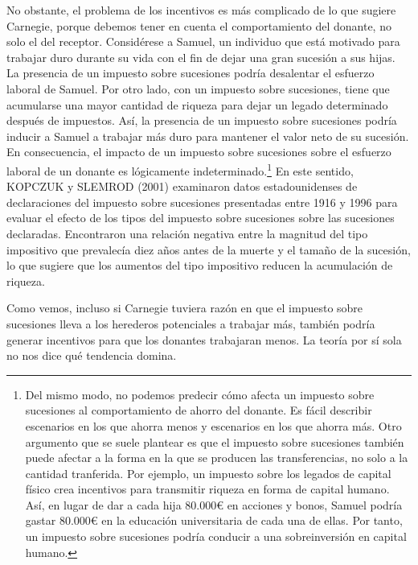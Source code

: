 \documentclass[10pt,a4paper]{article}
\begin{document}
No obstante, el problema de los incentivos es más complicado de lo que sugiere Carnegie, porque debemos tener en cuenta el comportamiento del donante, no solo el del receptor. Considérese a Samuel, un individuo que está motivado para trabajar duro durante su vida con el fin de dejar una gran sucesión a sus hijas. La presencia de un impuesto sobre sucesiones podría desalentar el esfuerzo laboral de Samuel. Por otro lado, con un impuesto sobre sucesiones, tiene que acumularse una mayor cantidad de riqueza para dejar un legado determinado después de impuestos. Así, la presencia de un impuesto sobre sucesiones podría inducir a Samuel a trabajar más duro para mantener el valor neto de su sucesión. En consecuencia, el impacto de un impuesto sobre sucesiones sobre el esfuerzo laboral de un donante es lógicamente indeterminado.\footnote{%
    Del mismo modo, no podemos predecir cómo afecta un impuesto sobre sucesiones al comportamiento de ahorro del donante. Es fácil describir escenarios en los que ahorra menos y escenarios en los que ahorra más. Otro argumento que se suele plantear es que el impuesto sobre sucesiones también puede afectar a la forma en la que se producen las transferencias, no solo a la cantidad tranferida. Por ejemplo, un impuesto sobre los legados de capital físico crea incentivos para transmitir riqueza en forma de capital humano. Así, en lugar de dar a cada hija $80.000€$ en acciones y bonos, Samuel podría gastar $80.000€$ en la educación universitaria de cada una de ellas. Por tanto, un impuesto sobre sucesiones podría conducir a una sobreinversión en capital humano.
} En este sentido, KOPCZUK y SLEMROD (2001) examinaron datos estadounidenses de declaraciones del impuesto sobre sucesiones presentadas entre 1916 y 1996 para evaluar el efecto de los tipos del impuesto sobre sucesiones sobre las sucesiones declaradas. Encontraron una relación negativa entre la magnitud del tipo impositivo que prevalecía diez años antes de la muerte y el tamaño de la sucesión, lo que sugiere que los aumentos del tipo impositivo reducen la acumulación de riqueza. 

Como vemos, incluso si Carnegie tuviera razón en que el impuesto sobre sucesiones lleva a los herederos potenciales a trabajar más, también podría generar incentivos para que los donantes trabajaran menos. La teoría por sí sola no nos dice qué tendencia domina. 
\end{document}
